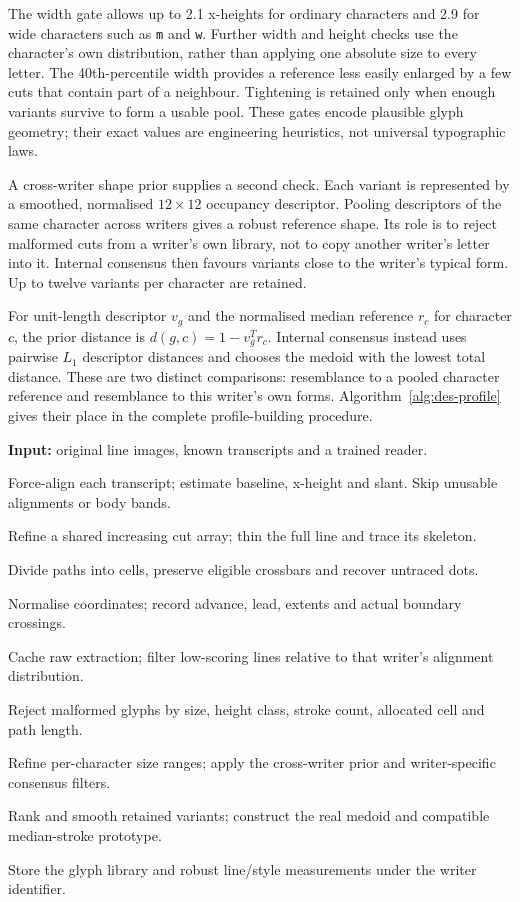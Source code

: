 The width gate allows up to 2.1 x-heights for ordinary characters and 2.9 for wide characters such as \texttt{m} and \texttt{w}. Further width and height checks use the character's own distribution, rather than applying one absolute size to every letter. The 40th-percentile width provides a reference less easily enlarged by a few cuts that contain part of a neighbour. Tightening is retained only when enough variants survive to form a usable pool. These gates encode plausible glyph geometry; their exact values are engineering heuristics, not universal typographic laws.

A cross-writer shape prior supplies a second check. Each variant is represented by a smoothed, normalised $12\times12$ occupancy descriptor. Pooling descriptors of the same character across writers gives a robust reference shape. Its role is to reject malformed cuts from a writer's own library, not to copy another writer's letter into it. Internal consensus then favours variants close to the writer's typical form. Up to twelve variants per character are retained.

For unit-length descriptor $v_g$ and the normalised median reference $r_c$ for character $c$, the prior distance is $d(g,c)=1-v_g^Tr_c$. Internal consensus instead uses pairwise $L_1$ descriptor distances and chooses the medoid with the lowest total distance. These are two distinct comparisons: resemblance to a pooled character reference and resemblance to this writer's own forms. Algorithm~\ref{alg:des-profile} gives their place in the complete profile-building procedure.
\begin{designalgorithm}
\caption{Labelled handwriting to a persistent writer profile}
\label{alg:des-profile}
\textbf{Input:} original line images, known transcripts and a trained reader.
\begin{designsteps}
\item Force-align each transcript; estimate baseline, x-height and slant. Skip unusable alignments or body bands.
\item Refine a shared increasing cut array; thin the full line and trace its skeleton.
\item Divide paths into cells, preserve eligible crossbars and recover untraced dots.
\item Normalise coordinates; record advance, lead, extents and actual boundary crossings.
\item Cache raw extraction; filter low-scoring lines relative to that writer's alignment distribution.
\item Reject malformed glyphs by size, height class, stroke count, allocated cell and path length.
\item Refine per-character size ranges; apply the cross-writer prior and writer-specific consensus filters.
\item Rank and smooth retained variants; construct the real medoid and compatible median-stroke prototype.
\item Store the glyph library and robust line/style measurements under the writer identifier.
\end{designsteps}
\end{designalgorithm}

